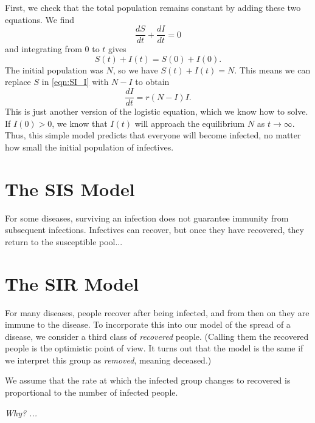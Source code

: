 \documentclass[reqno]{immbook}
\begin{document}
First, we check that the total population remains constant by adding these
two equations.  We find
\begin{equation}
  \frac{dS}{dt} + \frac{dI}{dt} = 0
\end{equation}
and integrating from $0$ to $t$ gives
\begin{equation}
  S(t) + I(t) = S(0)+I(0).
\end{equation}
The initial population was $N$, so we have
$S(t)+I(t)=N$.
This means we can replace $S$ in \eqref{eqn:SI_I} with
$N-I$ to obtain
\begin{equation}
  \frac{dI}{dt} = r(N-I)I.
\end{equation}
This is just another version of the logistic equation, 
which we know how to solve.
If $I(0)>0$, we know that $I(t)$ will approach the
equilibrium $N$ as $t\rightarrow\infty$.
Thus, this simple model predicts that
everyone will become infected, no matter how small
the initial population of infectives.

\section{The SIS Model}
%
%
For some diseases, surviving an infection
does not guarantee immunity from subsequent infections.
Infectives can recover,
but once they have recovered, they return to the
susceptible pool... 


\section{The SIR Model}
For many diseases, people recover after being infected,
and from then on they are immune to the disease.
To incorporate this into our model of the spread of
a disease, we consider a third class of \emph{recovered}
people. (Calling them the recovered people is the
optimistic point of view.  It turns out that the
model is the same if we interpret this group as
\emph{removed}, meaning deceased.)

We assume that the rate at which the infected
group changes to recovered is proportional to
the number of infected people.

\emph{Why? ...}
\end{document}
